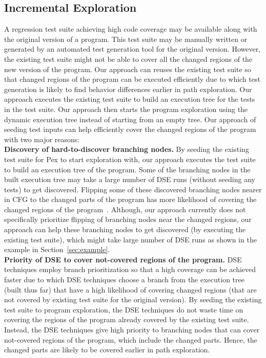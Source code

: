 \subsection{Incremental Exploration}
\label{sec:incremental}
A regression test suite achieving high code coverage may be available along with the original version of  a program. This test suite may be manually written or generated by an automated test generation tool for the original version. However, the existing test suite might not be able to cover all the changed regions of the new version of the program. Our approach can reuses the existing test suite so that changed regions of the program can be executed efficiently due to which test generation is likely to find behavior differences earlier in path exploration. Our approach executes the existing test suite to build an execution
tree for the tests in the test suite. Our approach then starts the program
exploration using the dynamic execution tree instead of starting from an empty
tree. Our approach of seeding test inputs can help efficiently cover the changed regions of the program with two major reasons:
\\ \textbf{Discovery of hard-to-discover branching nodes.} By seeding the existing test suite for Pex to start exploration with, our approach executes the test suite to build an execution tree of the program. Some of the branching nodes in the built execution tree may take a large number of DSE runs (without seeding any tests) to get discovered. Flipping some of these discovered branching nodes nearer in CFG to the changed parts of the
program has more likelihood of covering the changed regions of the program~\cite{burnim}. Although, our approach currently does not specifically prioritize flipping of branching nodes near the changed regions, our approach can help these branching nodes to get discovered (by executing the existing test suite), which might take large number of DSE runs as shown in the example in Section~\ref{sec:example}.
\\ \textbf{Priority of DSE to cover not-covered regions of the program.} DSE techniques employ branch prioritization so that a high coverage can be achieved faster due to which DSE techniques choose a branch from the execution tree (built thus far) that have a high likelihood of covering changed regions (that are not covered by existing test suite for the original version). By seeding the existing test suite to program exploration, the DSE techniques do not waste time on covering the regions of the program already covered by the existing test suite. Instead, the DSE techniques give high priority to branching nodes that can cover not-covered regions of the program, which include the changed parts. Hence, the changed parts are likely to be covered earlier in path exploration.
 
